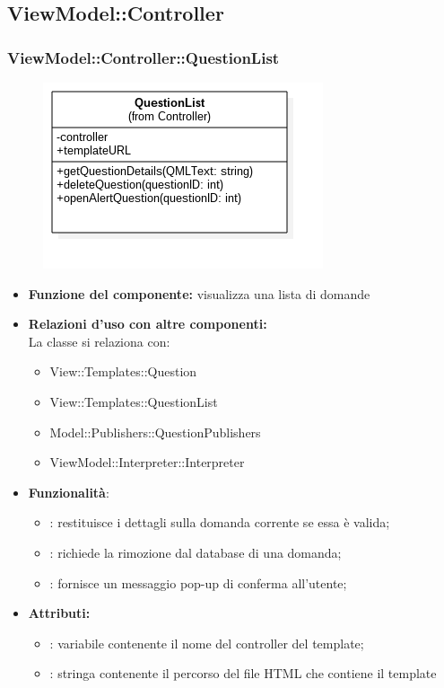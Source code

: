 \subsection{ViewModel::Controller}
\subsubsection{ViewModel::Controller::QuestionList}
\begin{figure}[h!]
\begin{center}
	\includegraphics[scale=0.4]{../images/ViewModel/Controller/QuestionList.png}
\end{center}
\end{figure}
\begin{itemize}
\item\textbf{Funzione del componente:} visualizza una lista di domande
				\item\textbf{Relazioni d'uso con altre componenti:} \\
La classe si relaziona con:
	\begin{itemize}
		\item View::Templates::Question
		\item View::Templates::QuestionList
		\item Model::Publishers::QuestionPublishers
		\item ViewModel::Interpreter::Interpreter	
	\end{itemize}
\item\textbf{Funzionalità}:
\begin{itemize}
		\item{}: restituisce i dettagli sulla domanda corrente se essa è valida;\\
		\item{}: richiede la rimozione dal database di una domanda;\\
		\item{}: fornisce un messaggio pop-up di conferma all'utente;\\
	\end{itemize}
	\item\textbf{Attributi:}
	\begin{itemize}
	\item{}: variabile contenente il nome del controller del template;\\
 
 	\item{}: stringa contenente il percorso del file HTML che contiene il template\\
	\end{itemize}
\end{itemize}
